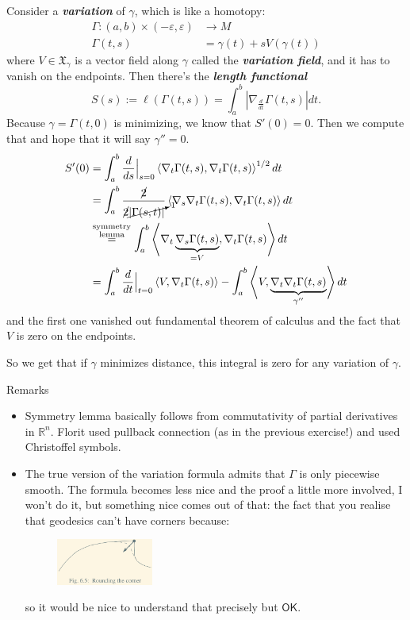 Consider a \textit{\textbf{variation}} of \(\gamma\), which is like a homotopy:
\begin{align*}
	\Gamma: (a,b)\times(-\varepsilon,\varepsilon) &\longrightarrow M \\
	\Gamma(t,s) &=\gamma(t)+sV(\gamma(t))
\end{align*}
where \(V \in \mathfrak{X}_\gamma\) is a vector field along \(\gamma\) called the \textit{\textbf{variation field}}, and it has to vanish on the endpoints. Then there's the \textit{\textbf{length functional}} 
\[S(s):=\ell(\Gamma(t,s))=\int_a^b|\nabla_{\frac{d}{dt}}\Gamma(t,s)|dt.\]
Because \(\gamma=\Gamma(t,0)\) is minimizing, we know that \(S'(0)=0\). Then we compute that and hope that it will say \(\gamma''=0\).
\begin{align*}
S'(0)&=\int_a^b\frac{d}{ds}\Big|_{s=0}\left<\nabla_t\Gamma(t,s),\nabla_t\Gamma(t,s)\right>^{1/2}dt\\
&=\int_a^b \frac{\cancel{2}}{\cancel{2}\cancelto{1}{\left|\Gamma(s,t)\right|}}\left<\nabla_s \nabla_t\Gamma(t,s),\nabla_t\Gamma(t,s)\right>dt\\
&\overset{\substack{\text{symmetry}  \\ \text{lemma} }}{=}\int_a^b\left<\nabla_t\underbrace{\nabla_s\Gamma(t,s)}_{=V},\nabla_t\Gamma(t,s)\right>dt\\
&=\int_a^b\frac{d}{dt}\Big|_{t=0}\left<V,\nabla_t\Gamma(t,s)\right>-\int_a^b\left<V,\underbrace{\nabla_t\nabla_t\Gamma(t,s)}_{\gamma''}\right>dt
\end{align*}
and the first one vanished out fundamental theorem of calculus and the fact that \(V\) is zero on the endpoints.

So we get that if \(\gamma\) minimizes distance, this integral is zero for any variation of \(\gamma\).

\begin{thing8}{Remarks}\leavevmode
\begin{itemize}
\item Symmetry lemma basically follows from commutativity of partial derivatives in \(\mathbb{R}^{n}\). Florit used pullback connection (as in the previous exercise!) and \cite{ler} used Christoffel symbols.
\item The true version of the variation formula admits that \(\Gamma\) is only piecewise smooth. The formula becomes less nice and the proof a little more involved, I won't do it, but something nice comes out of that: the fact that you realise that geodesics can't have corners because:
	\begin{figure}[H]
		\centering
		\includegraphics[width=0.3\textwidth]{fig3}
	\end{figure}
	so it would be nice to understand that precisely but \(\mathsf{OK}\).
\end{itemize}
\end{thing8}


